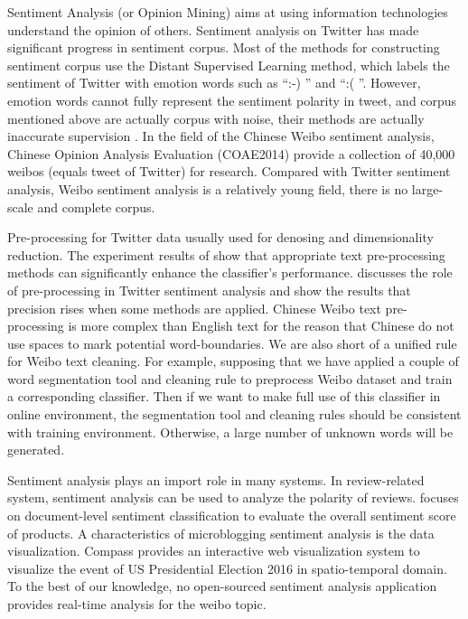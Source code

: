 \documentclass[runningheads]{llncs}
\begin{document}
Sentiment Analysis (or Opinion Mining) aims at using information technologies understand the opinion of others. Sentiment analysis on Twitter has made significant progress in sentiment corpus. Most of the methods for constructing sentiment corpus\cite{iosifidis2017large} use the Distant Supervised Learning method\cite{go2009twitter}, which labels the sentiment of Twitter with emotion words such as ``:-) '' and ``:( ''. However, emotion words cannot fully represent the sentiment polarity in tweet, and corpus mentioned above are actually corpus with noise, their methods are actually inaccurate supervision \cite{zhou2017brief}. In the field of the Chinese Weibo sentiment analysis, Chinese Opinion Analysis Evaluation (COAE2014) \cite{Yang2015Task} provide a collection of 40,000 weibos (equals tweet of Twitter) for research. Compared with Twitter sentiment analysis, Weibo sentiment analysis is a relatively young field, there is no large-scale and complete corpus.

Pre-processing for Twitter data usually used for denosing and dimensionality reduction. The experiment results of \cite{haddi2013role} show that appropriate text pre-processing methods can significantly enhance the classifier's performance. \cite{bao2014role} discusses the role of pre-processing in Twitter sentiment analysis and show the results that precision rises when some methods are applied. Chinese Weibo text pre-processing is more complex than English text for the reason that Chinese do not use spaces to mark potential word-boundaries. We are also short of a unified rule for Weibo text cleaning. For example, supposing that we have applied a couple of word segmentation tool and cleaning rule to preprocess Weibo dataset and train a corresponding classifier. Then if we want to make full use of this classifier in online environment, the segmentation tool and cleaning rules should be consistent with training environment. Otherwise, a large number of unknown words will be generated.

Sentiment analysis plays an import role in many systems. In review-related system, sentiment analysis can be used to analyze the polarity of reviews. \cite{song2019distilling} focuses on document-level sentiment classification to evaluate the overall sentiment score of products. A characteristics of microblogging sentiment analysis is the data visualization. Compass \cite{paul2017compass} provides an interactive web visualization system to visualize the event of US Presidential Election 2016 in spatio-temporal domain. To the best of our knowledge, no open-sourced sentiment analysis application provides real-time analysis for the weibo topic.
\end{document}
